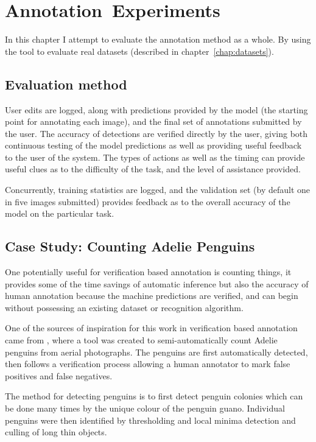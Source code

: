 \chapter{Annotation~Experiments}
\label{chap:annotation} 

In this chapter I attempt to evaluate the annotation method as a whole. By using the tool to evaluate real datasets (described in chapter~\ref{chap:datasets}). 


\section {Evaluation method}




User edits are logged, along with predictions provided by the model (the starting point for annotating each image), and the final set of annotations submitted by the user. The accuracy of detections are verified directly by the user, giving both continuous testing of the model predictions as well as providing useful feedback to the user of the system. The types of actions as well as the timing can provide useful clues as to the difficulty of the task, and the level of assistance provided.

Concurrently, training statistics are logged, and the validation set (by default one in five images submitted) provides feedback as to the overall accuracy of the model on the particular task.



\section{Case Study: Counting Adelie Penguins}

One potentially useful for verification based annotation is counting things, it provides some of the time savings of automatic inference but also the accuracy of human annotation because the machine predictions are verified, and can begin without possessing an existing dataset or recognition algorithm.


One of the sources of inspiration for this work in verification based annotation came from \cite{McNeill2011}, where a tool was created to semi-automatically count Adelie penguins from aerial photographs. The penguins are first automatically detected, then follows a verification process allowing a human annotator to mark false positives and false negatives.

The method for detecting penguins is to first detect penguin colonies which can be done many times by the unique colour of the penguin guano. Individual penguins were then identified by thresholding and local minima detection and culling of long thin objects. 

